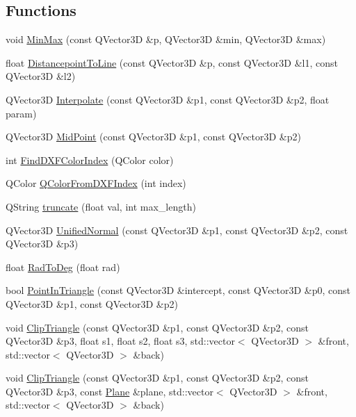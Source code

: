 \subsection*{Functions}
\begin{DoxyCompactItemize}
\item 
void \hyperlink{namespaceShipCAD_aa5d3fc63603d716d3e24244049e1e510}{Min\-Max} (const Q\-Vector3\-D \&p, Q\-Vector3\-D \&min, Q\-Vector3\-D \&max)
\item 
float \hyperlink{namespaceShipCAD_a69361fa79b1f818e21306f6266ee45d3}{Distancepoint\-To\-Line} (const Q\-Vector3\-D \&p, const Q\-Vector3\-D \&l1, const Q\-Vector3\-D \&l2)
\item 
Q\-Vector3\-D \hyperlink{namespaceShipCAD_a83f7c2b40959a0d02a2cc1085b0d07ee}{Interpolate} (const Q\-Vector3\-D \&p1, const Q\-Vector3\-D \&p2, float param)
\item 
Q\-Vector3\-D \hyperlink{namespaceShipCAD_ad1ad66c896fe763fb4603989ff1f1182}{Mid\-Point} (const Q\-Vector3\-D \&p1, const Q\-Vector3\-D \&p2)
\item 
int \hyperlink{namespaceShipCAD_a87efc267ae07a84fb1cd55a4562c2907}{Find\-D\-X\-F\-Color\-Index} (Q\-Color color)
\item 
Q\-Color \hyperlink{namespaceShipCAD_a9956eca83968462fc4c48c376a10d577}{Q\-Color\-From\-D\-X\-F\-Index} (int index)
\item 
Q\-String \hyperlink{namespaceShipCAD_a83d943939c1d84473bb904360116f7be}{truncate} (float val, int max\-\_\-length)
\item 
Q\-Vector3\-D \hyperlink{namespaceShipCAD_a81e47e31f89000550b007c0f9a4d09aa}{Unified\-Normal} (const Q\-Vector3\-D \&p1, const Q\-Vector3\-D \&p2, const Q\-Vector3\-D \&p3)
\item 
float \hyperlink{namespaceShipCAD_a3ad1916db38fb61e8a053f944df49cee}{Rad\-To\-Deg} (float rad)
\item 
bool \hyperlink{namespaceShipCAD_ae1773f0e415446342401a67430a8b643}{Point\-In\-Triangle} (const Q\-Vector3\-D \&intercept, const Q\-Vector3\-D \&p0, const Q\-Vector3\-D \&p1, const Q\-Vector3\-D \&p2)
\item 
void \hyperlink{namespaceShipCAD_a36b9b33181823761bc327d66c36c8d8f}{Clip\-Triangle} (const Q\-Vector3\-D \&p1, const Q\-Vector3\-D \&p2, const Q\-Vector3\-D \&p3, float s1, float s2, float s3, std\-::vector$<$ Q\-Vector3\-D $>$ \&front, std\-::vector$<$ Q\-Vector3\-D $>$ \&back)
\item 
void \hyperlink{namespaceShipCAD_a41e6294f71b66bca070c744accbb3ef2}{Clip\-Triangle} (const Q\-Vector3\-D \&p1, const Q\-Vector3\-D \&p2, const Q\-Vector3\-D \&p3, const \hyperlink{classShipCAD_1_1Plane}{Plane} \&plane, std\-::vector$<$ Q\-Vector3\-D $>$ \&front, std\-::vector$<$ Q\-Vector3\-D $>$ \&back)

\end{DoxyCompactItemize}
